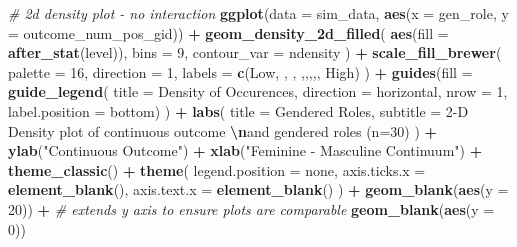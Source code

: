 \documentclass[
]{book}
\newenvironment{Shaded}{\begin{snugshade}}{\end{snugshade}}
\newcommand{\AttributeTok}[1]{\textcolor[rgb]{0.13,0.29,0.53}{#1}}
\newcommand{\CommentTok}[1]{\textcolor[rgb]{0.56,0.35,0.01}{\textit{#1}}}
\newcommand{\DecValTok}[1]{\textcolor[rgb]{0.00,0.00,0.81}{#1}}
\newcommand{\FunctionTok}[1]{\textcolor[rgb]{0.13,0.29,0.53}{\textbf{#1}}}
\newcommand{\NormalTok}[1]{#1}
\newcommand{\SpecialCharTok}[1]{\textcolor[rgb]{0.81,0.36,0.00}{\textbf{#1}}}
\newcommand{\StringTok}[1]{\textcolor[rgb]{0.31,0.60,0.02}{#1}}
\begin{document}
\begin{Shaded}
\begin{Highlighting}[]
\CommentTok{\# 2d density plot {-} no interaction}
\FunctionTok{ggplot}\NormalTok{(}\AttributeTok{data =}\NormalTok{ sim\_data, }\FunctionTok{aes}\NormalTok{(}\AttributeTok{x =}\NormalTok{ gen\_role, }\AttributeTok{y =}\NormalTok{ outcome\_num\_pos\_gid)) }\SpecialCharTok{+} 
  \FunctionTok{geom\_density\_2d\_filled}\NormalTok{(}
    \FunctionTok{aes}\NormalTok{(}\AttributeTok{fill =} \FunctionTok{after\_stat}\NormalTok{(level)), }\AttributeTok{bins =} \DecValTok{9}\NormalTok{, }\AttributeTok{contour\_var =} \StringTok{\textquotesingle{}ndensity\textquotesingle{}}
\NormalTok{    ) }\SpecialCharTok{+}
  \FunctionTok{scale\_fill\_brewer}\NormalTok{(}
    \AttributeTok{palette =} \DecValTok{16}\NormalTok{, }\AttributeTok{direction =} \DecValTok{1}\NormalTok{, }
    \AttributeTok{labels =} \FunctionTok{c}\NormalTok{(}\StringTok{\textquotesingle{}Low\textquotesingle{}}\NormalTok{, }\StringTok{\textquotesingle{}\textquotesingle{}}\NormalTok{, }\StringTok{\textquotesingle{}\textquotesingle{}}\NormalTok{, }\StringTok{\textquotesingle{}\textquotesingle{}}\NormalTok{,}\StringTok{\textquotesingle{}\textquotesingle{}}\NormalTok{,}\StringTok{\textquotesingle{}\textquotesingle{}}\NormalTok{,}\StringTok{\textquotesingle{}\textquotesingle{}}\NormalTok{,}\StringTok{\textquotesingle{}\textquotesingle{}}\NormalTok{, }\StringTok{\textquotesingle{}High\textquotesingle{}}\NormalTok{)}
\NormalTok{    ) }\SpecialCharTok{+}
  \FunctionTok{guides}\NormalTok{(}\AttributeTok{fill =} \FunctionTok{guide\_legend}\NormalTok{(}
    \AttributeTok{title =} \StringTok{\textquotesingle{}Density of Occurences\textquotesingle{}}\NormalTok{, }
    \AttributeTok{direction =} \StringTok{\textquotesingle{}horizontal\textquotesingle{}}\NormalTok{, }\AttributeTok{nrow =} \DecValTok{1}\NormalTok{, }
    \AttributeTok{label.position =} \StringTok{\textquotesingle{}bottom\textquotesingle{}}\NormalTok{)}
\NormalTok{    ) }\SpecialCharTok{+}
  \FunctionTok{labs}\NormalTok{(}
    \AttributeTok{title =} \StringTok{\textquotesingle{}Gendered Roles\textquotesingle{}}\NormalTok{,}
    \AttributeTok{subtitle =} \StringTok{\textquotesingle{}2{-}D Density plot of continuous outcome }\SpecialCharTok{\textbackslash{}n}\StringTok{and gendered roles (n=30)\textquotesingle{}}
\NormalTok{    ) }\SpecialCharTok{+}
  \FunctionTok{ylab}\NormalTok{(}\StringTok{"Continuous Outcome"}\NormalTok{) }\SpecialCharTok{+} \FunctionTok{xlab}\NormalTok{(}\StringTok{"Feminine {-} Masculine Continuum"}\NormalTok{) }\SpecialCharTok{+}
  \FunctionTok{theme\_classic}\NormalTok{() }\SpecialCharTok{+}
  \FunctionTok{theme}\NormalTok{(}
    \AttributeTok{legend.position =} \StringTok{\textquotesingle{}none\textquotesingle{}}\NormalTok{,}
    \AttributeTok{axis.ticks.x =} \FunctionTok{element\_blank}\NormalTok{(),}
    \AttributeTok{axis.text.x =} \FunctionTok{element\_blank}\NormalTok{()}
\NormalTok{  ) }\SpecialCharTok{+}
  \FunctionTok{geom\_blank}\NormalTok{(}\FunctionTok{aes}\NormalTok{(}\AttributeTok{y =} \DecValTok{20}\NormalTok{)) }\SpecialCharTok{+} \CommentTok{\# extends y axis to ensure plots are comparable}
  \FunctionTok{geom\_blank}\NormalTok{(}\FunctionTok{aes}\NormalTok{(}\AttributeTok{y =} \DecValTok{0}\NormalTok{))}
\end{Highlighting}
\end{Shaded}
\end{document}

